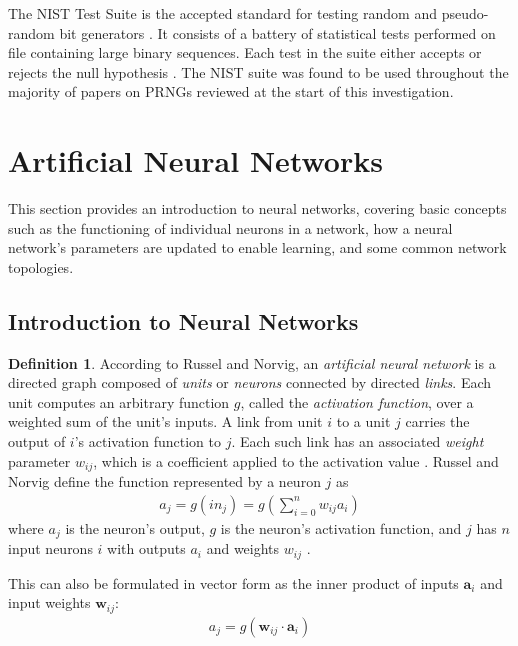 \documentclass[12pt, titlepage]{report}
\theoremstyle{definition}
\newtheorem{definition}{Definition}
\begin{document}
The NIST Test Suite is the accepted standard for testing random and pseudo-random bit generators \cite{lavasani2009practical}. It consists of a battery of statistical tests performed on file containing large binary sequences. Each test in the suite either accepts or rejects the null hypothesis \cite{rukhin2001statistical}. The NIST suite was found to be used throughout the majority of papers on PRNGs reviewed at the start of this investigation.




\section{Artificial Neural Networks}
This section provides an introduction to neural networks, covering basic concepts such as the functioning of individual neurons in a network, how a neural network's parameters are updated to enable learning, and some common network topologies.


\subsection{Introduction to Neural Networks}\label{subsection:neural_intro}
\begin{definition}
According to Russel and Norvig, an \emph{artificial neural network} is a directed graph composed of \emph{units} or \emph{neurons} connected by directed \emph{links}. Each unit computes an arbitrary function $g$, called the \emph{activation function}, over a weighted sum of the unit's inputs. A link from unit $i$ to a unit $j$ carries the output of $i$'s activation function to $j$. Each such link has an associated \emph{weight} parameter $w_{ij}$, which is a coefficient applied to the activation value \cite[p. 727-731]{russel2009artificial}. Russel and Norvig define the function represented by a neuron $j$ as
\begin{gather}\label{eq:activation}
a_j = g(in_j) = g\left(\sum_{i=0}^{n} w_{ij}a_i\right)
\end{gather}
where $a_j$ is the neuron's output, $g$ is the neuron's activation function, and $j$ has $n$ input neurons $i$ with outputs $a_i$ and weights $w_{ij}$ \cite[p. 728]{russel2009artificial}.
\end{definition}

This can also be formulated in vector form as the inner product of inputs $\bm{a}_i$ and input weights $\bm{w}_{ij}$:
\begin{gather}\label{eq:activation_vector}
a_j = g(\bm{w}_{ij}\cdot\bm{a}_i)
\end{gather}
\end{document}

